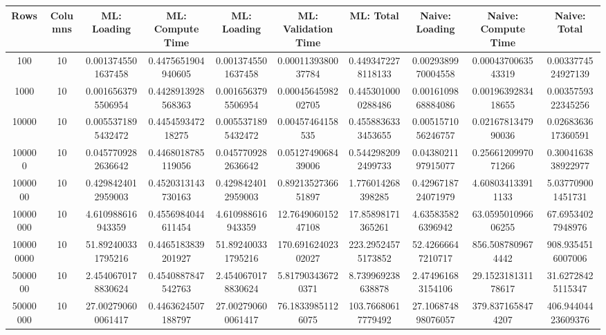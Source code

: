 \begin{table}[htb]
    \centering
    \begin{tabular}{@{}cccccccccc@{}}
        \toprule
        Rows & Columns & ML: Loading & ML: Compute Time & ML: Loading & ML: Validation Time & ML: Total & Naive: Loading & Naive: Compute Time & Naive: Total \\
        \midrule
        100 & 10 & 0.0013745501637458 & 0.4475651904940605 & 0.0013745501637458 & 0.0001139380037784 & 0.4493472278118133 & 0.0029389970004558 & 0.0004370063543319 & 0.0033774524927139 \\
        1000 & 10 & 0.0016563795506954 & 0.4428913928568363 & 0.0016563795506954 & 0.0004564598202705 & 0.4453010000288486 & 0.0016109868884086 & 0.0019639283418655 & 0.0035759322345256 \\
        10000 & 10 & 0.0055371895432472 & 0.445459347218275 & 0.0055371895432472 & 0.00457464158535 & 0.4558836333453655 & 0.0051571056246757 & 0.0216781347990036 & 0.0268363617360591 \\
        100000 & 10 & 0.0457709282636642 & 0.4468018785119056 & 0.0457709282636642 & 0.0512749068439006 & 0.5442982092499733 & 0.0438021197915077 & 0.2566120997071266 & 0.3004163838922977 \\
        1000000 & 10 & 0.4298424012959003 & 0.4520313143730163 & 0.4298424012959003 & 0.8921352736651897 & 1.776014268398285 & 0.4296718724071979 & 4.608034133911133 & 5.037709001451731 \\
        10000000 & 10 & 4.610988616943359 & 0.4556984044611454 & 4.610988616943359 & 12.764906015247108 & 17.85898171365261 & 4.635835826396942 & 63.059501096606255 & 67.69534027948976 \\
        100000000 & 10 & 51.892400331795216 & 0.4465183839201927 & 51.892400331795216 & 170.69162402302027 & 223.29524575173852 & 52.42666647210717 & 856.5087809674442 & 908.9354516007006 \\
        5000000 & 10 & 2.4540670178830624 & 0.4540887847542763 & 2.4540670178830624 & 5.817903436720371 & 8.739969238638878 & 2.474961683154106 & 29.152318131178617 & 31.62728425115347 \\
        50000000 & 10 & 27.002790600061417 & 0.4463624507188797 & 27.002790600061417 & 76.18339851126075 & 103.76680617779492 & 27.106874898076057 & 379.8371658474207 & 406.94404423609376 \\
        \bottomrule
    \end{tabular}
\end{table}